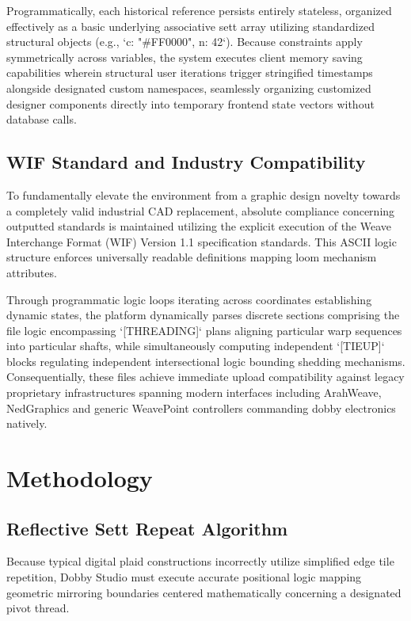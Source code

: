 Programmatically, each historical reference persists entirely stateless, organized effectively as a basic underlying associative sett array utilizing standardized structural objects (e.g., `{c: "#FF0000", n: 42}`). Because constraints apply symmetrically across variables, the system executes client memory saving capabilities wherein structural user iterations trigger stringified timestamps alongside designated custom namespaces, seamlessly organizing customized designer components directly into temporary frontend state vectors without database calls.

\subsection{WIF Standard and Industry Compatibility}
To fundamentally elevate the environment from a graphic design novelty towards a completely valid industrial CAD replacement, absolute compliance concerning outputted standards is maintained utilizing the explicit execution of the Weave Interchange Format (WIF) Version 1.1 specification standards. This ASCII logic structure enforces universally readable definitions mapping loom mechanism attributes.

Through programmatic logic loops iterating across coordinates establishing dynamic states, the platform dynamically parses discrete sections comprising the file logic encompassing `[THREADING]` plans aligning particular warp sequences into particular shafts, while simultaneously computing independent `[TIEUP]` blocks regulating independent intersectional logic bounding shedding mechanisms. Consequentially, these files achieve immediate upload compatibility against legacy proprietary infrastructures spanning modern interfaces including ArahWeave, NedGraphics and generic WeavePoint controllers commanding dobby electronics natively.

\section{Methodology}

\subsection{Reflective Sett Repeat Algorithm}
Because typical digital plaid constructions incorrectly utilize simplified edge tile repetition, Dobby Studio must execute accurate positional logic mapping geometric mirroring boundaries centered mathematically concerning a designated pivot thread.

